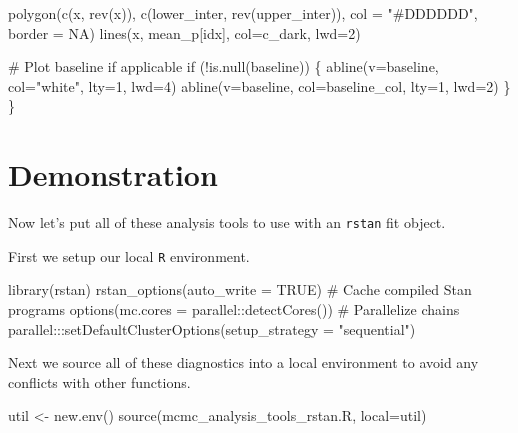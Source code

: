 \documentclass[
  letterpaper,
  DIV=11,
  numbers=noendperiod]{scrartcl}
\newenvironment{Shaded}{\begin{snugshade}}{\end{snugshade}}
\newcommand{\AttributeTok}[1]{\textcolor[rgb]{0.40,0.45,0.13}{#1}}
\newcommand{\CommentTok}[1]{\textcolor[rgb]{0.37,0.37,0.37}{#1}}
\newcommand{\ConstantTok}[1]{\textcolor[rgb]{0.56,0.35,0.01}{#1}}
\newcommand{\ControlFlowTok}[1]{\textcolor[rgb]{0.00,0.23,0.31}{#1}}
\newcommand{\DecValTok}[1]{\textcolor[rgb]{0.68,0.00,0.00}{#1}}
\newcommand{\FunctionTok}[1]{\textcolor[rgb]{0.28,0.35,0.67}{#1}}
\newcommand{\KeywordTok}[1]{\textcolor[rgb]{0.00,0.23,0.31}{#1}}
\newcommand{\NormalTok}[1]{\textcolor[rgb]{0.00,0.23,0.31}{#1}}
\newcommand{\OperatorTok}[1]{\textcolor[rgb]{0.37,0.37,0.37}{#1}}
\newcommand{\OtherTok}[1]{\textcolor[rgb]{0.00,0.23,0.31}{#1}}
\newcommand{\SpecialCharTok}[1]{\textcolor[rgb]{0.37,0.37,0.37}{#1}}
\newcommand{\StringTok}[1]{\textcolor[rgb]{0.13,0.47,0.30}{#1}}
\begin{document}
\begin{Shaded}
\begin{Highlighting}[]
\NormalTok{  polygon(c(x, rev(x)), c(lower\_inter, rev(upper\_inter)),}
\NormalTok{          col }\OperatorTok{=} \StringTok{"\#DDDDDD"}\NormalTok{, border }\OperatorTok{=}\NormalTok{ NA)}
\NormalTok{  lines(x, mean\_p[idx], col}\OperatorTok{=}\NormalTok{c\_dark, lwd}\OperatorTok{=}\DecValTok{2}\NormalTok{)}
  
  \CommentTok{\# Plot baseline if applicable}
  \ControlFlowTok{if}\NormalTok{ (}\OperatorTok{!}\KeywordTok{is}\NormalTok{.null(baseline)) \{}
\NormalTok{    abline(v}\OperatorTok{=}\NormalTok{baseline, col}\OperatorTok{=}\StringTok{"white"}\NormalTok{, lty}\OperatorTok{=}\DecValTok{1}\NormalTok{, lwd}\OperatorTok{=}\DecValTok{4}\NormalTok{)}
\NormalTok{    abline(v}\OperatorTok{=}\NormalTok{baseline, col}\OperatorTok{=}\NormalTok{baseline\_col, lty}\OperatorTok{=}\DecValTok{1}\NormalTok{, lwd}\OperatorTok{=}\DecValTok{2}\NormalTok{)}
\NormalTok{  \}}
\NormalTok{\}}
\end{Highlighting}
\end{Shaded}

\section{Demonstration}\label{demonstration}

Now let's put all of these analysis tools to use with an \texttt{rstan}
fit object.

First we setup our local \texttt{R} environment.

\begin{Shaded}
\begin{Highlighting}[]
\FunctionTok{library}\NormalTok{(rstan)}
\FunctionTok{rstan\_options}\NormalTok{(}\AttributeTok{auto\_write =} \ConstantTok{TRUE}\NormalTok{)            }\CommentTok{\# Cache compiled Stan programs}
\FunctionTok{options}\NormalTok{(}\AttributeTok{mc.cores =}\NormalTok{ parallel}\SpecialCharTok{::}\FunctionTok{detectCores}\NormalTok{()) }\CommentTok{\# Parallelize chains}
\NormalTok{parallel}\SpecialCharTok{:::}\FunctionTok{setDefaultClusterOptions}\NormalTok{(}\AttributeTok{setup\_strategy =} \StringTok{"sequential"}\NormalTok{)}
\end{Highlighting}
\end{Shaded}

Next we source all of these diagnostics into a local environment to
avoid any conflicts with other functions.

\begin{Shaded}
\begin{Highlighting}[]
\NormalTok{util }\OtherTok{\textless{}{-}} \FunctionTok{new.env}\NormalTok{()}
\FunctionTok{source}\NormalTok{(}\StringTok{\textquotesingle{}mcmc\_analysis\_tools\_rstan.R\textquotesingle{}}\NormalTok{, }\AttributeTok{local=}\NormalTok{util)}
\end{Highlighting}
\end{Shaded}
\end{document}

